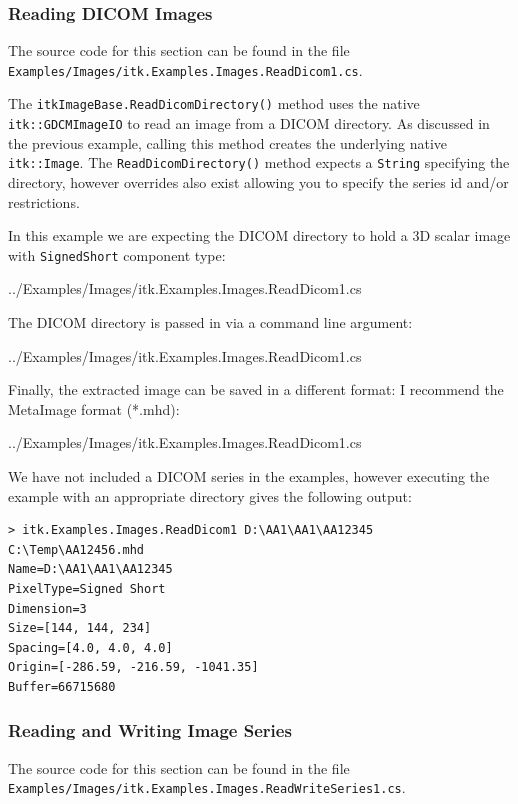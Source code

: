\documentclass{InsightArticle}
\def\code#1{\texttt{#1}}
\begin{document}
\subsubsection{Reading DICOM Images}
The source code for this section can be found in the file\\
\code{Examples/Images/itk.Examples.Images.ReadDicom1.cs}.

The \code{itkImageBase.ReadDicomDirectory()} method uses the 
native \code{itk::GDCMImageIO} to read an image from a DICOM directory.
As discussed in the previous example, calling this method creates
the underlying native \code{itk::Image}.
The \code{ReadDicomDirectory()} method expects a \code{String} specifying
the directory, however overrides also exist allowing you to specify the
series id and/or restrictions.

In this example we are expecting the DICOM directory to hold
a 3D scalar image with \code{SignedShort} component type:
\begin{center}
	
	{../Examples/Images/itk.Examples.Images.ReadDicom1.cs}
\end{center}

The DICOM directory is passed in via a command line argument:
\begin{center}
	
	{../Examples/Images/itk.Examples.Images.ReadDicom1.cs}
\end{center}

Finally, the extracted image can be saved in a different format:
I recommend the MetaImage format (*.mhd):
\begin{center}
	
	{../Examples/Images/itk.Examples.Images.ReadDicom1.cs}
\end{center}

We have not included a DICOM series in the examples, however executing
the example with an appropriate directory gives the following output:
\begin{lstlisting}
> itk.Examples.Images.ReadDicom1 D:\AA1\AA1\AA12345 C:\Temp\AA12456.mhd
Name=D:\AA1\AA1\AA12345
PixelType=Signed Short
Dimension=3
Size=[144, 144, 234]
Spacing=[4.0, 4.0, 4.0]
Origin=[-286.59, -216.59, -1041.35]
Buffer=66715680
\end{lstlisting}

\subsubsection{Reading and Writing Image Series}
The source code for this section can be found in the file\\
\code{Examples/Images/itk.Examples.Images.ReadWriteSeries1.cs}.
\end{document}
